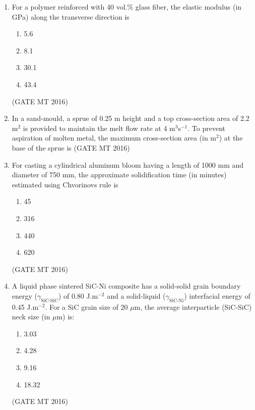 \documentclass[journal, 11pt, onecolumn]{IEEEtran}
\theoremstyle{remark}
\begin{document}
\begin{enumerate}
\item For a polymer reinforced with 40 vol.\% glass fiber, the elastic modulus (in GPa) along the transverse direction is  

\begin{multicols}{4}
\begin{enumerate}
\item 5.6  
\item 8.1  
\item 30.1  
\item 43.4  
\end{enumerate}
\end{multicols}

\noindent [E$_{\text{glass fiber}}$ = 70 GPa; E$_{\text{polymer}}$ = 3.5 GPa]
\hfill(GATE MT 2016)

\item In a sand-mould, a sprue of 0.25 m height and a top cross-section area of 2.2 m$^{2}$ is provided to maintain the melt flow rate at 4 m$^{3}$s$^{-1}$. To prevent aspiration of molten metal, the maximum cross-section area (in m$^{2}$) at the base of the sprue is 
\hfill(GATE MT 2016)

\item For casting a cylindrical aluminum bloom having a length of 1000 mm and diameter of 750 mm, the approximate solidification time (in minutes) estimated using Chvorinov\textquotesingle s rule is

\begin{multicols}{4}
\begin{enumerate}
\item 45  
\item 316  
\item 440  
\item 620  
\end{enumerate}
\end{multicols}

\hfill(GATE MT 2016)

\item A liquid phase sintered SiC-Ni composite has a solid-solid grain boundary energy ($\gamma_{\text{SiC-SiC}}$) of 0.80 J.m$^{-2}$ and a solid-liquid ($\gamma_{\text{SiC-Ni}}$) interfacial energy of 0.45 J.m$^{-2}$. For a SiC grain size of 20 $\mu$m, the average interparticle (SiC-SiC) neck size (in $\mu$m) is:

\begin{multicols}{4}
\begin{enumerate}
\item 3.03  
\item 4.28  
\item 9.16  
\item 18.32  
\end{enumerate}
\end{multicols}
\hfill(GATE MT 2016)


\end{enumerate}
\end{document}
